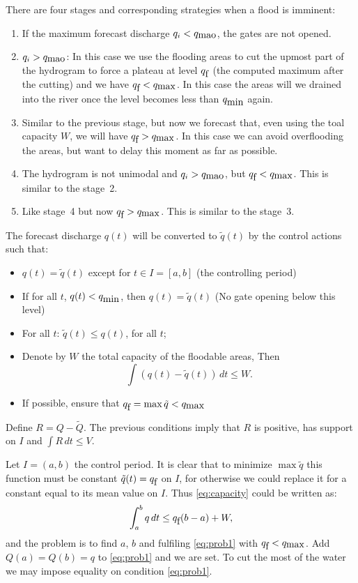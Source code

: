 There are four stages and corresponding strategies when a flood is
imminent:
\begin{enumerate}
\item If the maximum forecast discharge $q_{i}<q_{\mbox{mao}}$, the gates are not
opened. 
\item $q_{i}>q_{\mbox{mao}}$: In this case we use the flooding areas to cut the upmost
part of the hydrogram to force a plateau at level $q_{\mbox{f}}$ (the computed
maximum after the cutting) and we have $q_{\mbox{f}}<q_{\mbox{max}}$. In this case
the areas will we drained into the river once the level becomes less
than $q_{\mbox{min}}$ again.
\item Similar to the previous stage, but now we forecast that, even using
the toal capacity $W$, we will have $q_{\mbox{f}}>q_{\mbox{max}}$. In this case we
can avoid overflooding the areas, but want to delay this moment as
far as possible.
\item The hydrogram is not unimodal and $q_{i}>q_{\mbox{mao}}$, but $q_{\mbox{f}}<q_{\mbox{max}}$.
This is similar to the stage~2.
\item Like stage~4 but now $q_{\mbox{f}}>q_{\mbox{max}}$. This is similar to the stage~3.
\end{enumerate}
The forecast discharge $q(t)$ will be converted to $\tilde{q}(t)$
by the control actions such that:
\begin{itemize}
\item $q(t)=\tilde{q}(t)$ except for $t\in I=[a,b]$ (the controlling period) 
\item If for all $t$, $q(t)<q_{\mbox{min}}$, then $q(t)=\tilde{q}(t)$ (No gate
opening below this level) 
\item For all $t$: $\tilde{q}(t)\leq q(t)$, for all $t$; 
\item Denote by $W$ the total capacity of the floodable areas, Then \begin{equation}
\int(q(t)-\tilde{q}(t))\, dt\leq W.\label{eq:capacity}\end{equation}

\item If possible, ensure that $q_{\mbox{f}}=\max\tilde{q}<q_{\mbox{max}}$ 
\end{itemize}
Define $R=Q-\tilde{Q}$. The previous conditions imply that $R$ is
positive, has support on $I$ and $\int R\, dt\leq V$. 

Let $I=(a,b)$ the control period. It is clear that to minimize $\max\tilde{q}$
this function must be constant $\tilde{q}(t)=q_{\mbox{f}}$ on $I$, for otherwise
we could replace it for a constant equal to its mean value on $I$.
Thus \eqref{eq:capacity} could be written as: \begin{equation}
\int_{a}^{b}q\, dt\leq q_{\mbox{f}}(b-a)+W,\label{eq:prob1}\end{equation}
 and the problem is to find $a$, $b$ and fulfiling \eqref{eq:prob1}
with $q_{\mbox{f}}<q_{\mbox{max}}$. Add $Q(a)=Q(b)=q$ to \eqref{eq:prob1} and we
are set. To cut the most of the water we may impose equality on condition
\eqref{eq:prob1}. 


